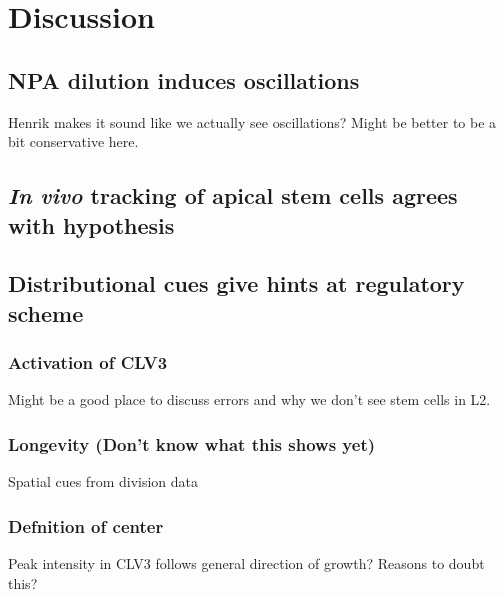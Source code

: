 \chapter{Discussion}

\ifpdf
\graphicspath{{Chapter4/Figs/Raster/}{Chapter4/Figs/PDF/}{Chapter4/Figs/}}
\else
\graphicspath{{Chapter4/Figs/Vector/}{Chapter4/Figs/}}
\fi

\section{NPA dilution induces oscillations}
Henrik makes it sound like we actually see oscillations? Might be better to be a
bit conservative here. 

\section{\textit{In vivo} tracking of apical stem cells agrees with hypothesis}

\section{Distributional cues give hints at regulatory scheme}
\subsection{Activation of CLV3}
Might be a good place to discuss errors and why we don't see stem cells in L2.

\subsection{Longevity (Don't know what this shows yet)}
Spatial cues from division data

\subsection{Defnition of center}
Peak intensity in CLV3 follows general direction of growth? Reasons to doubt
this?

